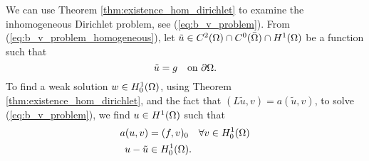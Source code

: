 


We can use Theorem \ref{thm:existence_hom_dirichlet} to examine the inhomogeneous Dirichlet problem, 
see (\ref{eq:b_v_problem}). From (\ref{eq:b_v_problem_homogeneous}), let 
$\tilde{u} \in C^2(\Omega)\cap C^0(\bar{\Omega}) \cap H^1(\Omega)$ be a function such that 
\begin{equation*}
   \tilde{u} = g \quad \text{on } \partial \Omega.
\end{equation*}
To find a weak solution $w \in H_0^1(\Omega)$, using Theorem \ref{thm:existence_hom_dirichlet}, and the 
fact that $(L\tilde{u},v) = a(\tilde{u},v)$, to solve (\ref{eq:b_v_problem}), 
we find $u \in H^1(\Omega)$ such that 
\begin{align*}
   a(u,v) &= (f,v)_0 \quad \forall v \in H_0^1(\Omega) \\
   u-\tilde{u} & \in H_0^1(\Omega).
\end{align*}
